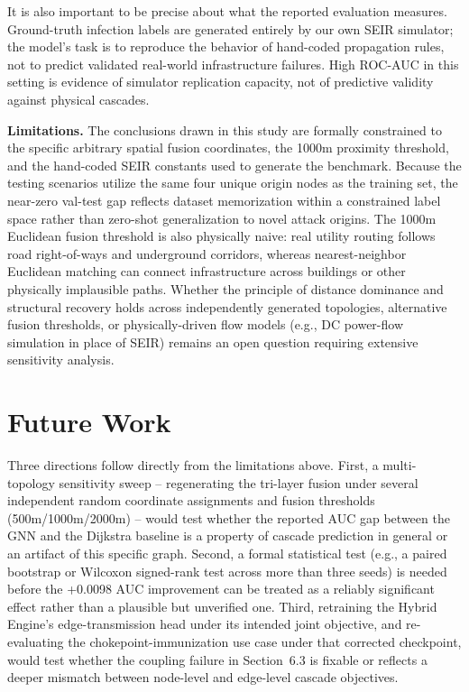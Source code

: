 \documentclass[10pt]{article}
\begin{document}
It is also important to be precise about what the reported evaluation measures. Ground-truth infection labels are generated entirely by our own SEIR simulator; the model's task is to reproduce the behavior of hand-coded propagation rules, not to predict validated real-world infrastructure failures. High ROC-AUC in this setting is evidence of simulator replication capacity, not of predictive validity against physical cascades.

\textbf{Limitations.} The conclusions drawn in this study are formally constrained to the specific arbitrary spatial fusion coordinates, the 1000m proximity threshold, and the hand-coded SEIR constants used to generate the benchmark. Because the testing scenarios utilize the same four unique origin nodes as the training set, the near-zero val-test gap reflects dataset memorization within a constrained label space rather than zero-shot generalization to novel attack origins. The 1000m Euclidean fusion threshold is also physically naive: real utility routing follows road right-of-ways and underground corridors, whereas nearest-neighbor Euclidean matching can connect infrastructure across buildings or other physically implausible paths. Whether the principle of distance dominance and structural recovery holds across independently generated topologies, alternative fusion thresholds, or physically-driven flow models (e.g., DC power-flow simulation in place of SEIR) remains an open question requiring extensive sensitivity analysis.

\section{Future Work}
Three directions follow directly from the limitations above. First, a multi-topology sensitivity sweep -- regenerating the tri-layer fusion under several independent random coordinate assignments and fusion thresholds (500m/1000m/2000m) -- would test whether the reported AUC gap between the GNN and the Dijkstra baseline is a property of cascade prediction in general or an artifact of this specific graph. Second, a formal statistical test (e.g., a paired bootstrap or Wilcoxon signed-rank test across more than three seeds) is needed before the +0.0098 AUC improvement can be treated as a reliably significant effect rather than a plausible but unverified one. Third, retraining the Hybrid Engine's edge-transmission head under its intended joint objective, and re-evaluating the chokepoint-immunization use case under that corrected checkpoint, would test whether the coupling failure in Section~6.3 is fixable or reflects a deeper mismatch between node-level and edge-level cascade objectives.
\end{document}
